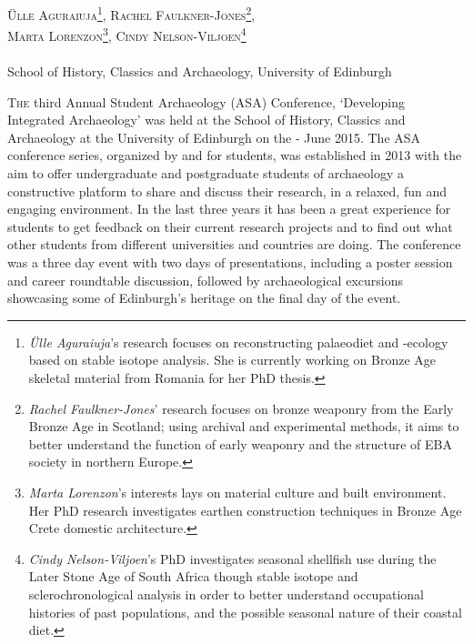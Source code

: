 \openingarticle
\def\ppages{\pagerange{ASA:firstpage}{ASA:lastpage}}
\def\shortauthor{Ülle Aguraiuja, Rachel Faulkner-Jones, Marta Lorenzon, Cindy Nelson-Viljoen}
\def\shorttitle{Third ‘Annual Student Archaeology’ Conference: Edinburgh, June 2015}
\def\maintitle{Third ‘Annual Student Archaeology’ Conference}
\def\authormail{asa2015edinburgh@gmail.com}
\def\affiliation{School of History, Classics and Archaeology, University of Edinburgh}
\mychapter{\maintitle}
\begin{center}
	{\Large\scshape Ülle Aguraiuja\footnote{\textit{Ülle Aguraiuja}'s research focuses on reconstructing palaeodiet and -ecology based on stable isotope analysis. She is currently working on Bronze Age skeletal material from Romania for her PhD thesis.},
		Rachel Faulkner-Jones\footnote{\textit{Rachel Faulkner-Jones}' research focuses on bronze weaponry from the Early Bronze Age in Scotland; using archival and experimental methods, it aims to better understand the function of early weaponry and the structure of EBA society in northern Europe.},\\ 
		Marta Lorenzon\footnote{\textit{Marta Lorenzon}'s interests lays on material culture and built environment. Her PhD research investigates earthen construction techniques in Bronze Age Crete domestic architecture.}, 
		Cindy Nelson-Viljoen\footnote{\textit{Cindy Nelson-Viljoen}'s PhD investigates seasonal shellfish use during the Later Stone Age of South Africa though stable isotope and sclerochronological analysis in order to better understand occupational histories of past populations, and the possible seasonal nature of their coastal diet.} }\\[1em]
	\email\\
	\affiliation
\end{center}
\vspace{3em}
\midarticle


\label{ASA:firstpage}%


	\lettrine[nindent=0em,lines=3]{T}{he} third Annual Student Archaeology (ASA) Conference, ‘Developing Integrated Archaeology' was held at the School of History, Classics and Archaeology at the University of Edinburgh on the - June 2015. The ASA conference series, organized by and for students, was established in 2013 with the aim to offer undergraduate and postgraduate students of archaeology a constructive platform to share and discuss their research, in a relaxed, fun and engaging environment. In the last three years it has been a great experience for students to get feedback on their current research projects and to find out what other students from different universities and countries are doing. The conference was a three day event with two days of presentations, including a poster session and career roundtable discussion, followed by archaeological excursions showcasing some of Edinburgh’s heritage on the final day of the event.
	

